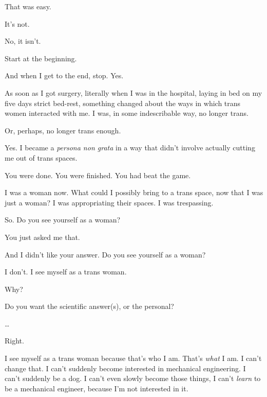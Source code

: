 \begin{ally}
That was easy.
\end{ally}
It's not.

\begin{ally}
No, it isn't.
\end{ally}
\newpage

\begin{ally}
Start at the beginning.
\end{ally}
And when I get to the end, stop. Yes.

As soon as I got surgery, literally when I was in the hospital, laying in bed on my five days strict bed-rest, something changed about the ways in which trans women interacted with me. I was, in some indescribable way, no longer trans.

\begin{ally}
Or, perhaps, no longer trans enough.
\end{ally}
Yes. I became a \emph{persona non grata} in a way that didn't involve actually cutting me out of trans spaces.

\begin{ally}
You were done. You were finished. You had beat the game.
\end{ally}
I was a woman now. What could I possibly bring to a trans space, now that I was just a woman? I was appropriating their spaces. I was trespassing.

\begin{ally}
So. Do you see yourself as a woman?
\end{ally}
You just asked me that.

\begin{ally}
And I didn't like your answer. Do you see yourself as a woman?
\end{ally}
I don't. I see myself as a trans woman.

\begin{ally}
Why?
\end{ally}
Do you want the scientific answer(s), or the personal?

\begin{ally}
\ldots{}
\end{ally}
Right.

I see myself as a trans woman because that's who I am. That's \emph{what} I am. I can't change that. I can't suddenly become interested in mechanical engineering. I can't suddenly be a dog. I can't even slowly become those things, I can't \emph{learn} to be a mechanical engineer, because I'm not interested in it.

